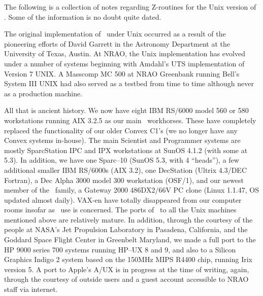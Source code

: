 %
%
\vfill\eject %


The following is a collection of notes regarding Z-routines for the Unix
version of \AIPS.  Some of the information is no doubt quite dated.\medskip


The original implementation of \AIPS\ under Unix occurred as a result
of the pioneering efforts of David Garrett in the Astronomy Department
at the University of Texas, Austin.  At NRAO, the Unix implementation
has evolved under a number of systems beginning with Amdahl's UTS
implementation of Version 7 UNIX.  A Masscomp MC 500 at NRAO Greenbank
running Bell's System III UNIX had also served as a testbed from time
to time although never as a production machine.


All that is ancient history.  We now have eight IBM RS/6000 model 560 or
580 workstations running AIX 3.2.5 as our main \AIPS\ workhorses.  These
have completely replaced the functionality of our older Convex C1's (we no
longer have any Convex systems in-house).  The main Scientist and
Programmer systems are mostly SparcStation IPC and IPX workstations at
SunOS 4.1.2 (with some at 5.3).  In addition, we have one Sparc--10 (SunOS
5.3, with 4 ``heads''), a few additional smaller IBM RS/6000s (AIX 3.2),
one DecStation (Ultrix 4.3/DEC Fortran), a Dec Alpha 3000 model 300
workstation (OSF/1), and our newest member of the \AIPS\ family, a Gateway
2000 486DX2/66V PC clone (Linux 1.1.47, OS updated almost daily).  VAX-en
have totally disappeared from our computer rooms insofar as \AIPS\ use is
concerned. The ports of \AIPS\ to all the Unix machines mentioned above
are relatively mature.  In addition, through the courtesy of the people at
NASA's Jet Propulsion Laboratory in Pasadena, California, and the Goddard
Space Flight Center in Greenbelt Maryland, we made a full port to the HP
9000 series 700 systems running HP--UX 8 and 9, and also to a Silicon
Graphics Indigo 2 system based on the 150MHz MIPS R4400 chip, running Irix
version 5.  A port to Apple's A/UX is in progress at the time of writing,
again, through the courtesy of outside users and a guest account accessible
to NRAO staff via internet.

